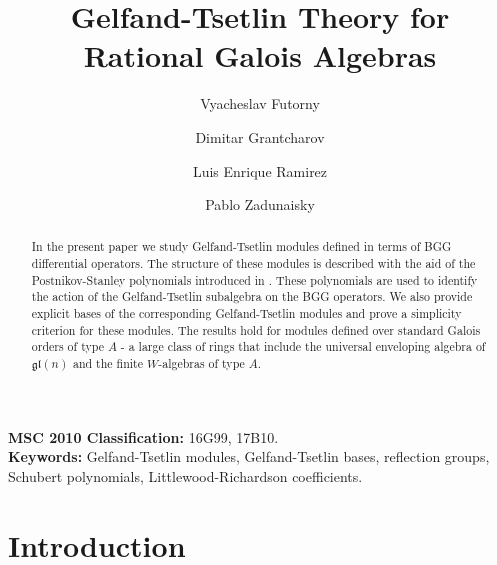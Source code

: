 \documentclass[11pt,fleqn]{amsart}
\begin{document}
\title{Gelfand-Tsetlin Theory for Rational Galois Algebras}
\date{}



\author[V.Futorny]{Vyacheslav Futorny}
\address{Instituto de Matem\'atica e Estat\'istica, Universidade de S\~ao
Paulo, S\~ao Paulo SP, Brasil} 
\author[D.Gratcharov]{Dimitar Grantcharov}
\address{\noindent
University of Texas at Arlington, Arlington, TX 76019, USA} 
\author[L.E.Ramirez]{Luis Enrique Ramirez}
\address{Universidade Federal do ABC, Santo Andr\'e-SP, Brasil} 
\author[P.Zadunaisky]{Pablo Zadunaisky}
\address{Instituto de Matem\'atica e Estat\'istica, Universidade de S\~ao
Paulo, S\~ao Paulo SP, Brasil} 


\begin{abstract} 
In the present paper we study Gelfand-Tsetlin modules defined in terms of BGG differential operators. The structure of these modules is described with the aid of the Postnikov-Stanley polynomials introduced in \cite{PS-chains-bruhat}. These polynomials are used to identify the  action of the Gelfand-Tsetlin subalgebra on the BGG operators. We also provide explicit bases of the corresponding Gelfand-Tsetlin modules and prove a simplicity criterion for these modules.  The results hold for modules  defined over standard Galois orders of type $A$ - a large class of rings  that include the universal enveloping algebra of $\mathfrak{gl} (n)$ and the finite $W$-algebras of type $A$.
\end{abstract}
\maketitle

\noindent\textbf{MSC 2010 Classification:} 16G99, 17B10.\\
\noindent\textbf{Keywords:} Gelfand-Tsetlin modules, Gelfand-Tsetlin bases, 
reflection groups, Schubert polynomials, Littlewood-Richardson coefficients.

\section{Introduction}
\end{document}
